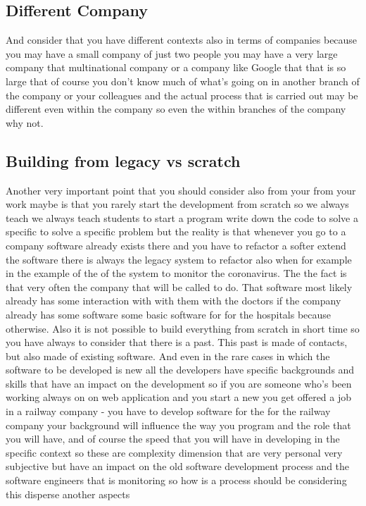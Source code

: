 \documentclass[conference, compsoc, twoside]{IEEEtran}
\begin{document}
\subsection{Different Company} %

And consider that you have different contexts also in terms of companies because you may have a small company of just two people you may have a very large company that multinational company or a company like Google that that is so large that of course you don't know much of what's going on in another branch of the company or your colleagues and the actual process that is carried out may be different even within the company so even the within branches of the company why not.
\subsection{Building from legacy vs scratch} %
\label{sub:building_from_scratch}

 Another very important point that you should consider also from your from your work maybe is that you rarely start the development from scratch so we always teach we always teach students to start a program write down the code to solve a specific to solve a specific problem but the reality is that whenever you go to a company software already exists there and you have to refactor a softer extend the software there is always the legacy system to refactor also when 
for example in the example of the of the system to monitor the coronavirus. 
 The the fact is that very often the company that will be called to do. 
 That software most likely already has some interaction with with them with the doctors if the company already has some software some basic software for for the hospitals because otherwise.
Also it is not possible to build everything from scratch in short time so you have always to consider that there is a past. 
This past is made of contacts, but also made of existing software. 
And even in the rare cases in which the software to be developed is new all the developers have specific backgrounds and skills that have an impact on the development so if you are someone who's been working always on on web application and you start a new you get offered a job in a railway company - you have to develop software for the for the railway company your background will influence the way you program and the role that you will have, and of course the speed that you will have in developing in the specific context so these are complexity dimension that are very personal very subjective but have an impact on the old software development process and the software engineers that is monitoring so how is a process should be considering this disperse another aspects
\end{document}
